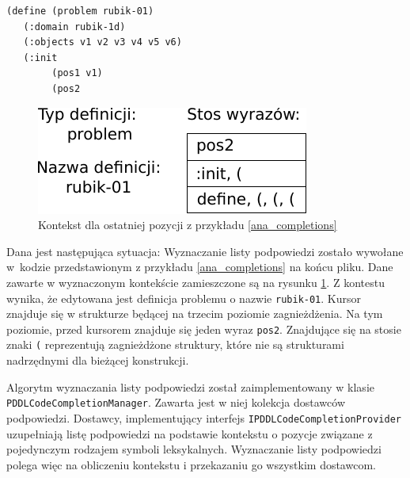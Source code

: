 \begin{Code}
\begin{lstlisting}[language=LISP,frame=single,label=ana_completions, caption=Edytowany kod PDDL]
(define (problem rubik-01)
   (:domain rubik-1d)
   (:objects v1 v2 v3 v4 v5 v6)
   (:init
        (pos1 v1)
        (pos2 
\end{lstlisting}
\end{Code}

\begin{figure}[h]
  \centering
    \includegraphics{img/ana_completion.pdf}
    \caption{Kontekst dla ostatniej pozycji z przykładu \ref{ana_completions}}
    \label{ana_context}
\end{figure}


Dana jest następująca sytuacja: Wyznaczanie listy podpowiedzi zostało wywołane w~kodzie przedstawionym
z przykładu \ref{ana_completions} na końcu pliku. Dane zawarte w wyznaczonym kontekście zamieszczone
są na rysunku \ref{ana_context}. Z kontestu wynika, że edytowana jest definicja problemu o nazwie
\texttt{rubik-01}. Kursor znajduje się w strukturze będącej na trzecim poziomie zagnieżdżenia.
 Na tym poziomie,
przed kursorem znajduje się jeden wyraz \texttt{pos2}. Znajdujące się na stosie znaki \texttt{(} 
reprezentują zagnieżdżone struktury, które nie są strukturami nadrzędnymi dla bieżącej konstrukcji.

\begin{sloppypar}
Algorytm wyznaczania listy podpowiedzi został zaimplementowany w klasie \texttt{PDDLCodeCompletionManager}.
Zawarta jest w niej kolekcja dostawców podpowiedzi. Dostawcy, implementujący interfejs
\texttt{IPDDLCodeCompletionProvider} uzupełniają listę podpowiedzi na podstawie kontekstu 
o pozycje związane z pojedynczym rodzajem symboli leksykalnych. Wyznaczanie listy podpowiedzi polega 
więc na obliczeniu kontekstu i przekazaniu go wszystkim dostawcom.
\end{sloppypar}

